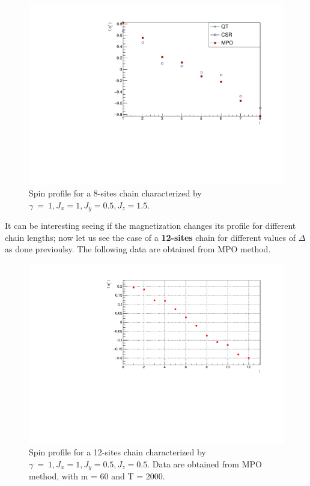 \begin{figure}[H]
    \centering
    \includegraphics[scale=0.7]{Figures/8sites_comparison/LM_8s_J10515.pdf}
    \caption{Spin profile for a 8-sites chain characterized by $\gamma~=~1, J_x=1, J_y=0.5, J_z=1.5$.}
    \label{fig:my_label}
\end{figure}

It can be interesting seeing if the magnetization changes its profile for different chain lengths; now let us see the case of a \textbf{12-sites} chain for different values of $\Delta$ as done previoulsy. The following data are obtained from MPO method.

\begin{figure}[H]
    \centering
    \includegraphics[scale=0.7]{Figures/12sites/LML012m060Time002000_J10505.pdf}
    \caption{Spin profile for a 12-sites chain characterized by $\gamma~=~1, J_x=1, J_y=0.5, J_z=0.5$. Data are obtained from MPO method, with m = 60 and T = 2000.}
    \label{fig:my_label}
\end{figure}

